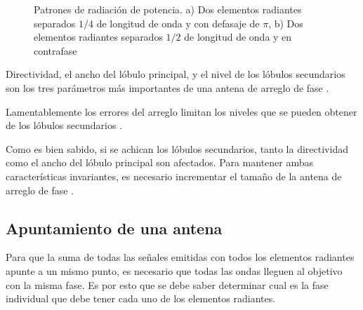 \begin{figure}[H]
	\centering
	\caption{Patrones de radiación de potencia. a) Dos elementos radiantes separados $1/4$ de longitud de onda y con 
		defasaje de $\pi$, b) Dos elementos radiantes separados $1/2$ de longitud de onda y en contrafase}
	\label{fig:directArrayPat}
\end{figure}

Directividad, el ancho del lóbulo principal, y el nivel de los lóbulos secundarios son los tres parámetros más importantes 
de una antena de arreglo de fase \cite{Hsiao1985}.

Lamentablemente los errores del arreglo limitan los niveles que se pueden obtener de los lóbulos secundarios \cite{Hsiao1985}.

Como es bien sabido, si se achican los lóbulos secundarios, tanto la directividad como el ancho del lóbulo principal son
afectados. Para mantener ambas características invariantes, es necesario incrementar el tamaño de la antena de arreglo de 
fase \cite{Hsiao1985}.


\subsection{Apuntamiento de una antena}\label{ssec:beamSteering}

Para que la suma de todas las señales emitidas con todos los elementos radiantes apunte a un mismo punto, es necesario que 
todas las ondas lleguen al objetivo con la misma fase. Es por esto que se debe saber determinar cual es la fase individual que 
debe tener cada uno de los elementos radiantes. 

